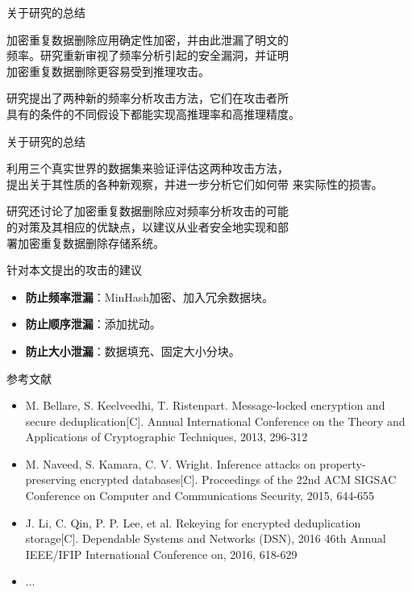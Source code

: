 \documentclass[aspectratio=43]{beamer}
\begin{document}
\begin{frame}{关于研究的总结}
\begin{card}
加密重复数据删除应用确定性加密，并由此泄漏了明文的\\[2mm]
频率。研究重新审视了频率分析引起的安全漏洞，并证明\\[2mm]
加密重复数据删除更容易受到推理攻击。
\end{card}

\begin{card}
研究提出了两种新的频率分析攻击方法，它们在攻击者所\\[2mm]
具有的条件的不同假设下都能实现高推理率和高推理精度。
\end{card}
\end{frame}

\begin{frame}{关于研究的总结}
\begin{card}
利用三个真实世界的数据集来验证评估这两种攻击方法，\\[2mm]
提出关于其性质的各种新观察，并进一步分析它们如何带
来实际性的损害。
\end{card}
\begin{card}
研究还讨论了加密重复数据删除应对频率分析攻击的可能\\[2mm]
的对策及其相应的优缺点，以建议从业者安全地实现和部\\[2mm]
署加密重复数据删除存储系统。
\end{card}
\end{frame}

\begin{frame}{针对本文提出的攻击的建议}
\begin{card}
\begin{itemize}
    \item \textbf{防止频率泄漏}：MinHash加密、加入冗余数据块。
    \item \textbf{防止顺序泄漏}：添加扰动。
    \item \textbf{防止大小泄漏}：数据填充、固定大小分块。
\end{itemize}
\end{card}
\end{frame}

\begin{frame}{参考文献}
\begin{itemize}
    \item M. Bellare, S. Keelveedhi, T. Ristenpart. Message-locked encryption and secure deduplication[C]. Annual International Conference on the Theory and Applications of Cryptographic Techniques, 2013, 296-312
    \item M. Naveed, S. Kamara, C. V. Wright. Inference attacks on property-preserving encrypted
databases[C]. Proceedings of the 22nd ACM SIGSAC Conference on Computer and Communications Security, 2015, 644-655
    \item J. Li, C. Qin, P. P. Lee, et al. Rekeying for encrypted deduplication storage[C]. Dependable
Systems and Networks (DSN), 2016 46th Annual IEEE/IFIP International Conference on, 2016, 618-629
    \item ...
\end{itemize}
\end{frame}
\end{document}
